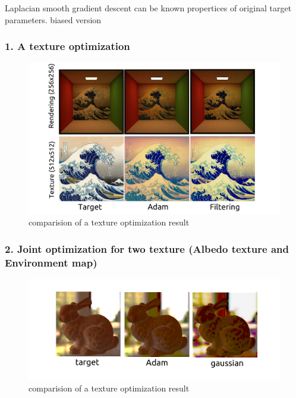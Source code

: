 Laplacian smooth gradient descent can be known propertices of original target parameters. 
biased version

\subsubsection{1. A texture optimization}

\begin{figure}[!h]
    \includegraphics[width=\textwidth]{figures/result-3.png}
    \caption{comparision of a texture optimization result}
    \label{fig:a-texture-comparision}
\end{figure}

\subsubsection{2. Joint optimization for two texture (Albedo texture and Environment map)}

\begin{figure}[!h]
    \includegraphics[width=\textwidth]{figures/result-4.png}
    \caption{comparision of a texture optimization result}
    \label{fig:a-texture-comparision}
\end{figure}

